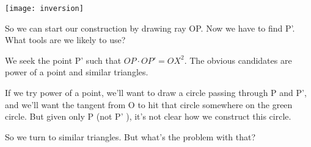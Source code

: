 \begin{center}
    \texttt{[image: inversion]}    
\end{center}
So we can start our construction by drawing ray OP.  Now we have to find P'.  What tools are we likely to use?








We seek the point P' such that $OP \cdot OP' = OX^2$.  The obvious candidates are power of a point and similar triangles.

If we try power of a point, we'll want to draw a circle passing through P and P', and we'll want the tangent from O to hit that circle somewhere on the green circle.  But given only P (not P' ), it's not clear how we construct this circle.

So we turn to similar triangles.  But what's the problem with that?







